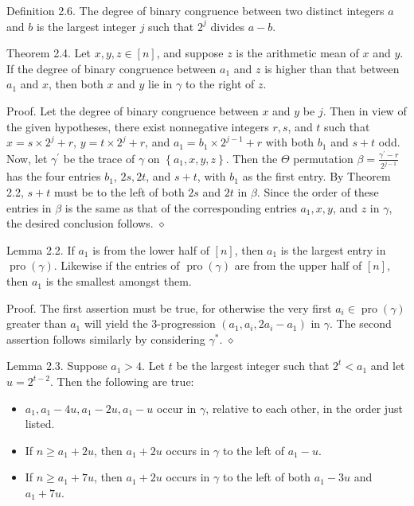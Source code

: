 \documentclass[10pt]{article}
\newcommand{\proofend}{\hfill\(\diamond\)}
\begin{document}
Definition 2.6. The degree of binary congruence between two distinct integers $a$ and $b$ is the largest integer $j$ such that $2^{j}$ divides $a-b$.

Theorem 2.4. Let $x, y, z \in[n]$, and suppose $z$ is the arithmetic mean of $x$ and $y$. If the degree of binary congruence between $a_{1}$ and $z$ is higher than that between $a_{1}$ and $x$, then both $x$ and $y$ lie in $\gamma$ to the right of $z$.

Proof. Let the degree of binary congruence between $x$ and $y$ be $j$. Then in view of the given hypotheses, there exist nonnegative integers $r, s$, and $t$ such that $x=s \times 2^{j}+r$, $y=t \times 2^{j}+r$, and $a_{1}=b_{1} \times 2^{j-1}+r$ with both $b_{1}$ and $s+t$ odd. Now, let $\gamma^{\prime}$ be the trace of $\gamma$ on $\left\{a_{1}, x, y, z\right\}$. Then the $\Theta$ permutation $\beta=\frac{\gamma^{\prime}-r}{2^{j-1}}$ has the four entries $b_{1}$, $2 s, 2 t$, and $s+t$, with $b_{1}$ as the first entry. By Theorem 2.2, $s+t$ must be to the left of both $2 s$ and $2 t$ in $\beta$. Since the order of these entries in $\beta$ is the same as that of the corresponding entries $a_{1}, x, y$, and $z$ in $\gamma$, the desired conclusion follows. \proofend

Lemma 2.2. If $a_{1}$ is from the lower half of $[n]$, then $a_{1}$ is the largest entry in $\operatorname{pro}(\gamma)$. Likewise if the entries of $\operatorname{pro}(\gamma)$ are from the upper half of $[n]$, then $a_{1}$ is the smallest amongst them.

Proof. The first assertion must be true, for otherwise the very first $a_{i} \in \operatorname{pro}(\gamma)$ greater than $a_{1}$ will yield the 3-progression $\left(a_{1}, a_{i}, 2 a_{i}-a_{1}\right)$ in $\gamma$. The second assertion follows similarly by considering $\gamma^{*}$. \proofend

Lemma 2.3. Suppose $a_{1}>4$. Let $t$ be the largest integer such that $2^{t}<a_{1}$ and let $u=2^{t-2}$. Then the following are true:

\begin{itemize}
  \item[(i)] $a_{1}, a_{1}-4 u, a_{1}-2 u, a_{1}-u$ occur in $\gamma$, relative to each other, in the order just listed.
  \item[(ii)] If $n \geq a_{1}+2 u$, then $a_{1}+2 u$ occurs in $\gamma$ to the left of $a_{1}-u$.
  \item[(iii)] If $n \geq a_{1}+7 u$, then $a_{1}+2 u$ occurs in $\gamma$ to the left of both $a_{1}-3 u$ and $a_{1}+7 u$.
\end{itemize}
\end{document}
